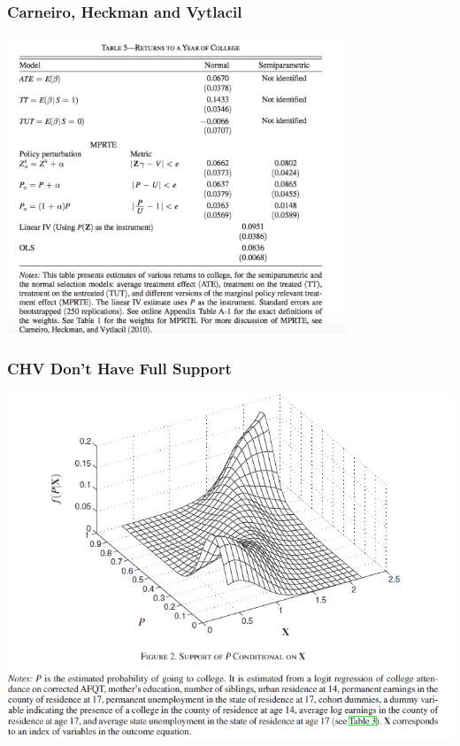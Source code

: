 \begin{frame}
\frametitle{Carneiro, Heckman and Vytlacil}
\begin{center}
\includegraphics[width=4in]{./resources/chv_tab5}
\end{center}
\end{frame}

\begin{frame}
  \frametitle{CHV Don't Have Full Support}
  \vspace{-10pt}
  \begin{center}
  \includegraphics[width= \textwidth]{./resources/CarnieroSupport}
  \end{center}
\end{frame}
  
